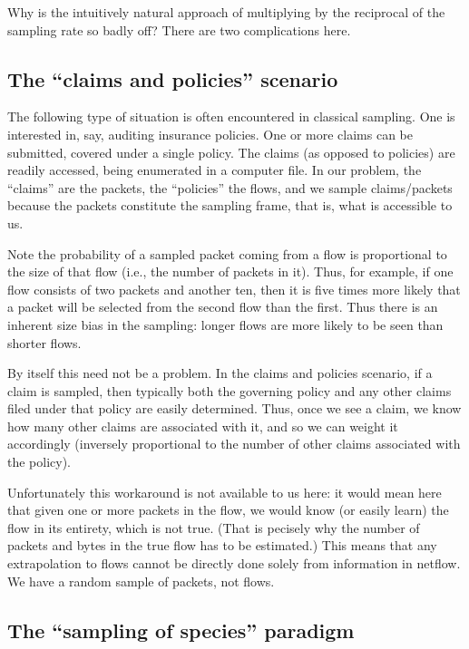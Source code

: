 \documentclass{paper}
\begin{document}
Why is the intuitively natural approach of multiplying by the reciprocal of the
sampling rate so badly off? There are two complications here.

\subsection{The ``claims and policies'' scenario}

The following type of situation is often encountered in classical sampling. One
is interested in, say, auditing insurance policies. One or more claims can be
submitted, covered under a single policy. The claims (as opposed to policies)
are readily accessed, being enumerated in a computer file. In our problem, the
``claims'' are the packets, the ``policies'' the flows, and we sample
claims/packets because the packets constitute the sampling frame, that is, what
is accessible to us.

Note the probability of a sampled packet coming from a flow is proportional to
the size of that flow (i.e., the number of packets in it). Thus, for example, if
one flow consists of two packets and another ten, then it is five times more
likely that a packet will be selected from the second flow than the first. Thus
there is an inherent size bias in the sampling: longer flows are more likely to
be seen than shorter flows.

By itself this need not be a problem. In the claims and policies scenario, if a
claim is sampled, then typically both the governing policy and any other claims
filed under that policy are easily determined. Thus, once we see a claim, we
know how many other claims are associated with it, and so we can weight it
accordingly (inversely proportional to the number of other claims associated
with the policy).

Unfortunately this workaround is not available to us here: it would mean here
that given one or more packets in the flow, we would know (or easily learn) the
flow in its entirety, which is not true. (That is pecisely why the number of
packets and bytes in the true flow has to be estimated.) This means that any
extrapolation to flows cannot be directly done solely from information in
netflow. We have a random sample of packets, not flows.

\subsection{The ``sampling of species'' paradigm}
\end{document}
